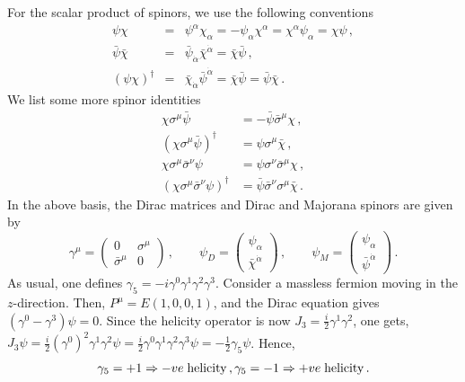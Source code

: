 For the scalar product of spinors, we use the following conventions 
\begin{eqnarray}
\psi \chi &= & \psi^{\alpha} \chi_{\alpha} = - \psi_{\alpha}
\chi^{\alpha} = \chi^{\alpha} \psi_{\alpha} = \chi \psi\,,\nonumber\\ 
\bar{\psi} \bar{\chi} &=& \bar{\psi}_{\dot{\alpha}} 
\bar{\chi}^{\dot{\alpha}} =\bar{\chi} \bar{\psi}\,,\nonumber \\
(\psi\chi)^\dagger&=&\bar{\chi}_{\dot{\alpha}}\bar{\psi}^{\dot{\alpha}}
=\bar{\chi}\bar{\psi}=\bar{\psi}\bar{\chi}\,. \nonumber
\end{eqnarray}
We list some more spinor identities
$$
\begin{array}{rl}
\chi\sigma^\mu\bar{\psi} & =-\bar{\psi}\bar{\sigma}^\mu\chi\,, \\
(\chi\sigma^\mu\bar{\psi})^\dagger & =\psi\sigma^\mu\bar{\chi}\,, \\
\chi\sigma^\mu\bar{\sigma}^\nu\psi & =\psi\sigma^\nu\bar{\sigma}^\mu
\chi \,,\\ 
(\chi\sigma^\mu\bar{\sigma}^\nu\psi)^\dagger & =\bar{\psi} 
\bar{\sigma}^\nu \sigma^\mu \bar{\chi}\,.
\end{array}
$$
In the above basis, the Dirac matrices and Dirac and Majorana spinors
are given by
\begin{equation}
\gamma^\mu = \left( \begin{array}{cc}
0 & \sigma^\mu \\ \bar{\sigma}^\mu & 0 \end{array} \right)\,, \qquad
\psi_D=\left(\begin{array}{c}\psi_\alpha\\\bar{\chi}^{\dot\alpha}
\end{array}\right)\,,\qquad
\psi_M=\left(\begin{array}{c}\psi_\alpha\\{\bar{\psi}^{\dot{\alpha}}}
\end{array}\right)\,.
\label{sp-comp}
\end{equation}
As usual, one defines $\gamma_5=-i\gamma^0\gamma^1\gamma^2\gamma^3$.
Consider a massless fermion moving in the $z$-direction. Then, $P^\mu=
E(1,0,0,1)$, and the Dirac equation gives $(\gamma^0-\gamma^3)\psi=0$. 
Since the helicity operator is now $J_3=\frac{i}{2}\gamma^1\gamma^2$,
one gets, $J_3\psi=\frac{i}{2}(\gamma^0)^2 \gamma^1\gamma^2\psi =
\frac{i}{2}\gamma^0\gamma^1\gamma^2\gamma^3\psi=-\frac{1}{2}\gamma_5\psi$.
Hence, 
$$
\gamma_5 =+1 \Rightarrow -ve \;{\rm helicity}\,,
\gamma_5 =-1 \Rightarrow +ve \;{\rm helicity}\,.
$$

